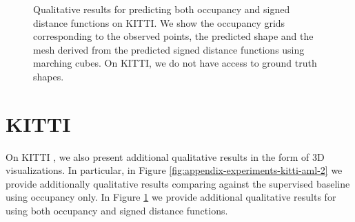 



\begin{figure}
  \centering

  \caption{Qualitative results for \AML predicting both occupancy and signed distance functions
  on KITTI. We show the occupancy grids corresponding to the observed points, the predicted shape
  and the mesh derived from the predicted signed distance functions using marching cubes. On KITTI,
  we do not have access to ground truth shapes.}
  \label{fig:appendix-experiments-kitti-aml-4}
\end{figure}

\FloatBarrier
\newpage
\section{KITTI}
\label{sec:appendix-experiments-kitti}

On KITTI \cite{GeigerLenzUrtasun:2012,GeigerLenzStillerUrtasun:2013},
we also present additional qualitative results in the form of 3D visualizations.
In particular, in Figure \ref{fig:appendix-experiments-kitti-aml-2}
we provide additionally qualitative results comparing \AML against
the supervised baseline using occupancy only. In Figure \ref{fig:appendix-experiments-kitti-aml-4}
we provide additional qualitative results for \AML using both occupancy and
signed distance functions.

